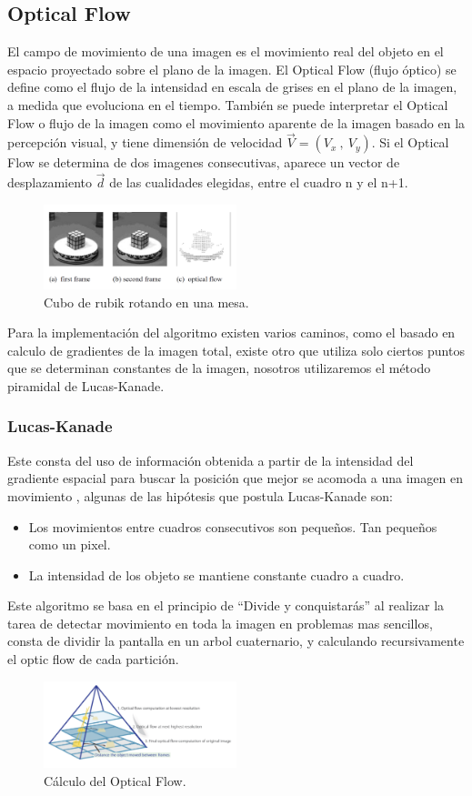 \subsection{Optical Flow} 
El campo de movimiento de una imagen es el movimiento real del objeto en el espacio proyectado sobre el plano de la imagen. El Optical Flow (flujo óptico) se define como el flujo de la intensidad en escala de grises en el plano de la imagen, a medida que evoluciona en el tiempo. También se puede interpretar el Optical Flow o flujo de la imagen como el movimiento aparente de la imagen  basado en la percepción visual, y tiene dimensión de velocidad $\vec{V}= (V_x \ , \ V_y)$. Si el Optical Flow se determina de dos imagenes consecutivas, aparece un vector de desplazamiento $\vec{d}$ de las cualidades elegidas, entre el cuadro n y el n+1.
\begin{figure}[H]
		\centering
		\includegraphics[width=0.5\textwidth]{Imagenes/opticalflowrubick.png}
		\caption{Cubo de rubik rotando en una mesa.}
		\label{fig:opticalflow1}
\end{figure}
Para la implementación del algoritmo existen varios caminos, como el basado en calculo de gradientes de la imagen total, existe otro que utiliza solo ciertos puntos que se determinan constantes de la imagen, nosotros utilizaremos el método piramidal de Lucas-Kanade.
\subsubsection{Lucas-Kanade} 
 Este consta del uso de información obtenida a partir de la intensidad del gradiente espacial para buscar la posición que mejor se acomoda a una imagen en movimiento \cite{ref:lucas-kanade} \cite{ref:lucas-kanade2}, algunas de las hipótesis que postula Lucas-Kanade son:
\begin{itemize}
\item Los movimientos entre cuadros consecutivos son pequeños. Tan pequeños como un pixel.
\item La intensidad de los objeto se mantiene constante cuadro a cuadro.
\end{itemize} 
Este algoritmo se basa en el principio de ``Divide y conquistarás'' al realizar la tarea de detectar movimiento en toda la imagen en problemas mas sencillos, consta de dividir la pantalla en un arbol cuaternario, y calculando recursivamente el optic flow de cada partición.
\begin{figure}[H]
		\centering
		\includegraphics[width=0.5\textwidth]{Imagenes/op.png}
		\caption{Cálculo del Optical Flow.}
		\label{fig:opticalflow1}
\end{figure}
